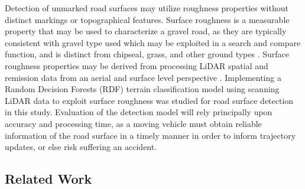\documentclass[journal,onecolumn]{IEEEtran}
\begin{document}
	{Detection of unmarked road surfaces may utilize roughness properties without distinct markings or topographical features. Surface roughness is a measurable property that may be used to characterize a gravel road, as they are typically consistent with gravel type used \cite{skorseth_gravel_nodate} which may be exploited in a search and compare function, and is distinct from chipseal, grass, and other ground types \cite{wan_road_2007, levi_3d_2012_light, levi_3d_2012_terrain}. Surface roughness properties may be derived from processing LiDAR spatial and remission data from an aerial and surface level perspective \cite{wan_road_2007, levi_3d_2012_light, levi_3d_2012_terrain, pollyea_experimental_2012,rychkov_computational_2012,lague_accurate_2013,brubaker_use_2013,turner_estimation_2014,campbell_lidar-based_2017,shepard_roughness_2001,tegowski_statistical_2016,sock_probabilistic_2016,milenkovic_roughness_2018,yadav_extraction_2017, yadav_rural_2018}. Implementing a Random Decision Forests (RDF) terrain classification model using scanning LiDAR data to exploit surface roughness was studied for road surface detection in this study. Evaluation of the detection model will rely principally upon accuracy and processing time, as a moving vehicle must obtain reliable information of the road surface in a timely manner in order to inform trajectory updates, or else risk suffering an accident.}
	
	\subsection{Related Work}
	
\end{document}
